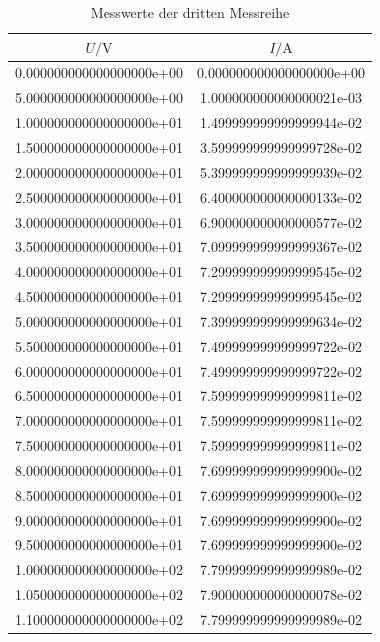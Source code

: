 \begin{table}
  \centering
  \caption{Messwerte der dritten Messreihe}
  \label{tab:Reihe3}
  \begin{tabular}{|S|S|}
    \toprule
    $U/\si{\volt}$ & $I/\si{\ampere}$ \\
    \midrule
    0.000000000000000000e+00 & 0.000000000000000000e+00\\
    5.000000000000000000e+00 & 1.000000000000000021e-03\\
    1.000000000000000000e+01 & 1.499999999999999944e-02\\
    1.500000000000000000e+01 & 3.599999999999999728e-02\\
    2.000000000000000000e+01 & 5.399999999999999939e-02\\
    2.500000000000000000e+01 & 6.400000000000000133e-02\\
    3.000000000000000000e+01 & 6.900000000000000577e-02\\
    3.500000000000000000e+01 & 7.099999999999999367e-02\\
    4.000000000000000000e+01 & 7.299999999999999545e-02\\
    4.500000000000000000e+01 & 7.299999999999999545e-02\\
    5.000000000000000000e+01 & 7.399999999999999634e-02\\
    5.500000000000000000e+01 & 7.499999999999999722e-02\\
    6.000000000000000000e+01 & 7.499999999999999722e-02\\
    6.500000000000000000e+01 & 7.599999999999999811e-02\\
    7.000000000000000000e+01 & 7.599999999999999811e-02\\
    7.500000000000000000e+01 & 7.599999999999999811e-02\\
    8.000000000000000000e+01 & 7.699999999999999900e-02\\
    8.500000000000000000e+01 & 7.699999999999999900e-02\\
    9.000000000000000000e+01 & 7.699999999999999900e-02\\
    9.500000000000000000e+01 & 7.699999999999999900e-02\\
    1.000000000000000000e+02 & 7.799999999999999989e-02\\
    1.050000000000000000e+02 & 7.900000000000000078e-02\\
    1.100000000000000000e+02 & 7.799999999999999989e-02\\

\end{tabular}
\end{table}
